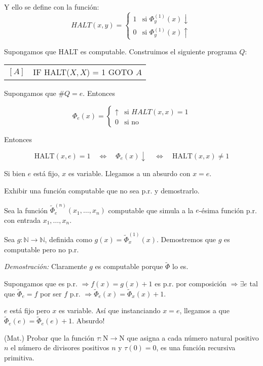 \begin{questions}
\begin{solution}
Y ello se define con la funci\'on: 
$$
HALT(x,y) = \left\{
\begin{array}{cl}
1 & \mbox{si } \Phi_y^{(1)}(x)\downarrow \\
0 & \mbox{si } \Phi_y^{(1)}(x)\uparrow
\end{array}\right.
$$

Supongamos que HALT es computable. Construimos el siguiente programa $Q$: 

\begin{tabular}{rl}
  $[A]$ & IF HALT($X,X$) = 1 GOTO $A$ 
\end{tabular}

Supongamos que $\#Q=e$. Entonces

$$
\Phi_e(x) = \left\{
\begin{array}{cl}
\uparrow & \mbox{si } HALT(x,x)=1 \\
0 & \mbox{si no} 
\end{array}\right.
$$

Entonces

$$
\text{HALT}(x,e)=1 \quad\Leftrightarrow\quad \Phi_e(x)\downarrow \quad\Leftrightarrow\quad \text{HALT}(x,x)\neq 1
$$

Si bien $e$ est\'a fijo, $x$ es variable. Llegamos a un absurdo con $x=e$. 
\end{solution}

\question Exhibir una función computable que no sea p.r. y demostrarlo.

\begin{solution}

Sea la funci\'on $\tilde{\Phi}_e^{(n)}(x_1,\dots,x_n)$ computable que simula a la $e$-\'esima funci\'on p.r. con entrada $x_1, \dots, x_n$.

Sea $g : \mathbb{N} \rightarrow \mathbb{N}$, definida como $g(x) = \tilde{\Phi}_x^{(1)}(x)$. Demostremos que $g$ es computable pero no p.r.

{\it Demostraci\'on: } Claramente $g$ es computable porque $\tilde{\Phi}$ lo es. 

Supongamos que es p.r. $\Rightarrow f(x) = g(x)+1$ es p.r. por composici\'on $\Rightarrow \exists e$ tal que $\tilde{\Phi}_e = f$ por ser $f$ p.r. $\Rightarrow\tilde{\Phi}_e(x) = \tilde{\Phi}_x(x)+1$.

$e$ est\'a fijo pero $x$ es variable. As\'i que instanciando $x=e$, llegamos a que $\tilde{\Phi}_e(e) = \tilde{\Phi}_e(e)+1$. Absurdo!

\end{solution}

\question (Mat.) Probar que la funci\'on $\tau : \mathrm{N} \rightarrow \mathrm{N}$ que asigna a cada n\'umero natural positivo $n$ el n\'umero de divisores positivos $n$ y $\tau(0)=0$, es una funci\'on recursiva primitiva. 


\end{questions}
